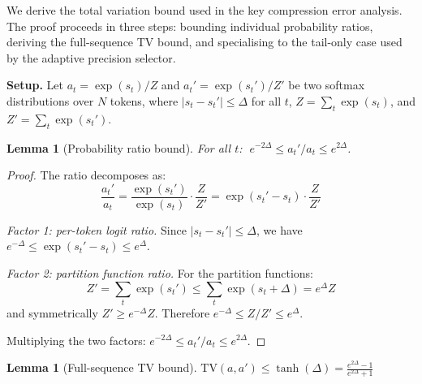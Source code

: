 \documentclass[10pt,twocolumn,a4paper]{article}
\newtheorem{lemma}[theorem]{Lemma}
\theoremstyle{definition}
\theoremstyle{remark}
\begin{document}
We derive the total variation bound used in the key compression error analysis.  The proof proceeds in three steps: bounding individual probability ratios, deriving the full-sequence TV bound, and specialising to the tail-only case used by the adaptive precision selector.

\textbf{Setup.}  Let $a_t = \exp(s_t)/Z$ and $a_t' = \exp(s_t')/Z'$ be two softmax distributions over $N$ tokens, where $|s_t - s_t'| \leq \Delta$ for all $t$, $Z = \sum_t \exp(s_t)$, and $Z' = \sum_t \exp(s_t')$.

\begin{lemma}[Probability ratio bound]
\label{lem:ratio}
For all $t$: $\; e^{-2\Delta} \leq a_t'/a_t \leq e^{2\Delta}$.
\end{lemma}

\begin{proof}
The ratio decomposes as:
\[
  \frac{a_t'}{a_t} = \frac{\exp(s_t')}{\exp(s_t)} \cdot \frac{Z}{Z'} = \exp(s_t' - s_t) \cdot \frac{Z}{Z'}
\]

\emph{Factor 1: per-token logit ratio.}  Since $|s_t - s_t'| \leq \Delta$, we have $e^{-\Delta} \leq \exp(s_t' - s_t) \leq e^{\Delta}$.

\emph{Factor 2: partition function ratio.}  For the partition functions:
\[
  Z' = \sum_t \exp(s_t') \leq \sum_t \exp(s_t + \Delta) = e^{\Delta} Z
\]
and symmetrically $Z' \geq e^{-\Delta} Z$.  Therefore $e^{-\Delta} \leq Z/Z' \leq e^{\Delta}$.

Multiplying the two factors: $e^{-2\Delta} \leq a_t'/a_t \leq e^{2\Delta}$.
\end{proof}

\begin{lemma}[Full-sequence TV bound]
\label{lem:tv}
$\displaystyle \mathrm{TV}(a, a') \leq \tanh(\Delta) = \frac{e^{2\Delta} - 1}{e^{2\Delta} + 1}$
\end{lemma}
\end{document}
